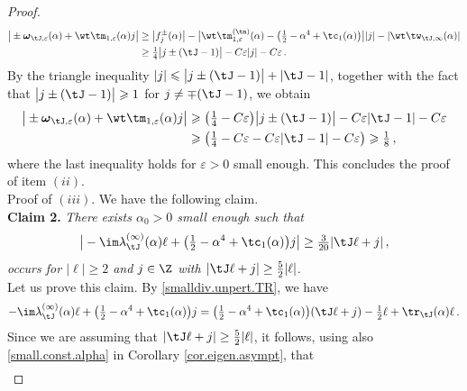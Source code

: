 \documentclass[a4paper,reqno,10pt]{article}
\newcommand{\bomega}{{\boldsymbol{\omega}}}
\begin{document}
\begin{proof}
  \begin{align}
  	 \big| \pm \bomega_{\tJ,\varepsilon}(\alpha) + \wt\tm_{1,\varepsilon}(\alpha)j \big| &  \geq \big|f_j^{\pm}(\alpha) \big| - \big| \wt\tm_{1,\varepsilon}^{(\tn)}(\alpha) - \big( \tfrac12 -\alpha^4 + \tc_{1}(\alpha) \big)  \big| |j| - |\wt\tw_{\tJ,\infty}(\alpha)| \\
  	 & \geq \tfrac14 \big| j \pm (\tJ-1) \big|- C\varepsilon |j| -C\varepsilon\,.
  \end{align}
  By the triangle inequality $|j| \leqslant \big|j \pm (\tJ-1)\big| + |\tJ-1|$, together with the fact that $\big|j \pm (\tJ-1)\big| \geqslant 1$ for $j\neq \mp(\tJ-1)$, we obtain
  \begin{align}
  	 \big| \pm \bomega_{\tJ,\varepsilon}(\alpha)  + \wt\tm_{1,\varepsilon}(\alpha)j\big| 
  	 & \geqslant \big(\tfrac14-C \varepsilon\big)\big| j \pm (\tJ-1) \big| -C\varepsilon |\tJ-1|-C\varepsilon \\
     &\geqslant  \big(\tfrac14-C \varepsilon-C\varepsilon |\tJ-1|-C\varepsilon \big)\geqslant  \tfrac{1}{8}\,,
  \end{align}
  where the last inequality holds for $\varepsilon>0$ small enough. This concludes the proof of item $(ii)$.
    	\\[1mm]
   	{\sc Proof of $(iii)$}. We have the following claim.
   	\\[1mm]
   	{\bf Claim 2.} {\it There exists $\alpha_{0}>0$ small enough such that}
   	\begin{equation}\label{claim-2.TR}
   			\big|  	-\im \lambda_{\tJ}^{(\infty)}(\alpha) \ell  + \big( \tfrac12 -\alpha^4 +\tc_{1}(\alpha)  \big) j  \big| \geq  \tfrac{3}{20} |\tJ\ell+j|\,,
   	\end{equation}
   	{\it occurs for $|\ell |\geq 2$ and $j\in \Z$ with  $|\tJ \ell + j|\geq 	\tfrac52 |\ell|$.}
    \\[1mm]
   	Let us prove this claim.
   		By \eqref{smalldiv.unpert.TR}, we have
   		\begin{align}
   				-\im \lambda_{\tJ}^{(\infty)}(\alpha) \ell  + \big( \tfrac12 -\alpha^4 +\tc_{1}(\alpha) \big) j   = \big( \tfrac12 - \alpha^4 +\tc_{1}(\alpha)  \big)(\tJ \ell +j) - \tfrac12\ell + \tr_{\tJ}(\alpha)\ell \,.
   		\end{align}
   		Since we are assuming that $|\tJ \ell + j| \geq \tfrac{5}{2}|\ell|$, it follows, using also \eqref{small.const.alpha} in Corollary \ref{cor.eigen.asympt}, that
        \begin{equation}
   			\begin{aligned}

\end{aligned}
\end{equation}
\end{proof}
\end{document}
